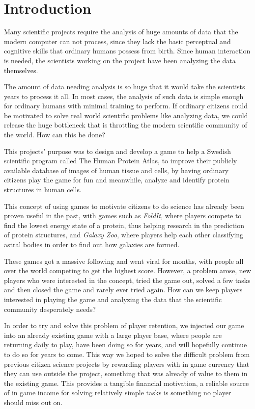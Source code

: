\section{Introduction}\label{sec:introduction}

Many scientific projects require the analysis of huge amounts of data that the modern computer can not process, since they lack the basic perceptual and cognitive skills that ordinary humans possess from birth. Since human interaction is needed, the scientists working on the project have been analyzing the data themselves. 

The amount of data needing analysis is so huge that it would take the scientists years to process it all. In most cases, the analysis of such data is simple enough for ordinary humans with minimal training to perform. If ordinary citizens could be motivated to solve real world scientific problems like analyzing data, we could release the huge bottleneck that is throttling the modern scientific community of the world. How can this be done?

This projects' purpose was to design and develop a game to help a Swedish scientific program called The Human Protein Atlas, to improve their publicly available database of images of human tissue and cells, by having ordinary citizens play the game for fun and meanwhile, analyze and identify protein structures in human cells.

This concept of using games to motivate citizens to do science has already been proven useful in the past, with games such as \emph{FoldIt}, where players compete to find the lowest energy state of a protein, thus helping research in the prediction of protein structures, and \emph{Galaxy Zoo}, where players help each other classifying astral bodies in order to find out how galaxies are formed.

These games got a massive following and went viral for months, with people all over the world competing to get the highest score. However, a problem arose, new players who were interested in the concept, tried the game out, solved a few tasks and then closed the game and rarely ever tried again. How can we keep players interested in playing the game and analyzing the data that the scientific community desperately needs?

In order to try and solve this problem of player retention, we injected our game into an already existing game with a large player base, where people are returning daily to play, have been doing so for years, and will hopefully continue to do so for years to come. This way we hoped to solve the difficult problem from previous citizen science projects by rewarding players with in game currency that they can use outside the project, something that was already of value to them in the existing game. This provides a tangible financial motivation, a reliable source of in game income for solving relatively simple tasks is something no player should miss out on.





